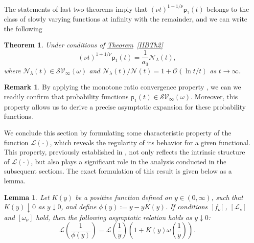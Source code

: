 \documentclass[10pt,reqno]{amsart}
\newtheorem{theorem}{Theorem}
\newtheorem{lemma}{Lemma}
\theoremstyle{definition}
\newtheorem{remark}{Remark}
\numberwithin{equation}{section}
\begin{document}
    The statements of last two theorems imply that ${{(\nu{t})}^{1+{1}/{\nu}}}{\textsf{p}_1}(t)$ belongs
    to the class of slowly varying functions at infinity with the remainder, and we can write the following
\begin{theorem}                  \label{IIBTh3}
    Under conditions of {\hyperref[IIBTh2]{Theorem}~\ref{IIBTh2}}
\begin{equation}                \label{IIB3.23}
    {{(\nu{t})}^{1+{1}/{\nu}}}{\textsf{p}_1}(t)=\frac{1}{{{a}_{0}}}{{\mathcal{N}}_{\lambda}}(t),
\end{equation}
    where ${{\mathcal{N}}_{\lambda}}(t)\in{{\mathcal{SV}}_{\infty }}(\omega)$ and
    ${{{\mathcal{N}}_{\lambda}}(t)}\big/{\mathcal{N}(t)}=1+\mathcal{O}\left( {\ln{t}}\big/{t}\right)$ as $t\to\infty$.
\end{theorem}

\begin{remark}                  \label{IIBRem2}
    By applying the monotone ratio convergence property {\cite{ImIJSA14}}, we can we readily confirm that probability
    functions ${\textsf{p}_1}(t)\in{{\mathcal{SV}}_{\infty}}(\omega)$. Moreover, this property allows us to
    derive a precise asymptotic expansion for these probability functions.
\end{remark}

    We conclude this section by formulating some characteristic property of the function $\mathcal{L}(\cdot)$,
    which reveals the regularity of its behavior for a given functional. This property, previously established
    in {\cite{ImCCIS24}}, not only reflects the intrinsic structure of $\mathcal{L}(\cdot)$, but also plays a significant
    role in the analysis conducted in the subsequent sections. The exact formulation of this result is given below as a lemma.

\begin{lemma}                   \label{IIBLem3}
    Let $K(y)$ be a positive function defined on $y\in(0,\infty)$, such that $K(y)\downarrow{0}$ as
    $y\downarrow{0}$, and define $\phi(y):=y-yK(y)$. If conditions $[{f}_{\nu}]$, $[{\mathcal{L}}_{\nu}]$ and
    $[{\omega}_{\nu}]$ hold, then the following asymptotic relation holds as $y\downarrow{0}$:
\begin{equation}                \label{IIB3.24}
    \mathcal{L}\left(\frac{1}{\phi(y)}\right)=\mathcal{L}\left(\frac{1}{y}\right)\left(1+K(y)\omega\left(\frac{1}{y}\right)\right).
\end{equation}
\end{lemma}
\end{document}
